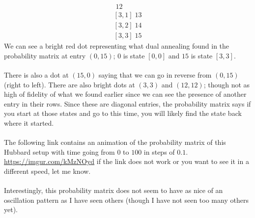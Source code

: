 \begin{align*}
    [3, 0]\; 12 \\
    [3, 1]\; 13 \\
    [3, 2]\; 14 \\
    [3, 3]\; 15
\end{align*}
We can see a bright red dot representing what dual annealing found in the probability matrix at entry $(0,15)$; $0$ is state $[0, 0]$ and $15$ is state $[3,3]$. \\
\\
There is also a dot at $(15,0)$ saying that we can go in reverse from $(0,15)$ (right to left).
There are also bright dots at $(3,3)$ and $(12,12)$; though not as high of fidelity of what we found earlier since we can see the presence of another entry in their rows.
Since these are diagonal entries, the probability matrix says if you start at those states and go to this time, you will likely find the state back where it started. \\
\\
The following link contains an animation of the probability matrix of this Hubbard setup with time going from $0$ to $100$ in steps of $0.1$.
\url{https://imgur.com/kMzNOyd}
if the link does not work or you want to see it in a different speed, let me know. \\
\\
Interestingly, this probability matrix does not seem to have as nice of an oscillation pattern as I have seen others (though I have not seen too many others yet).

